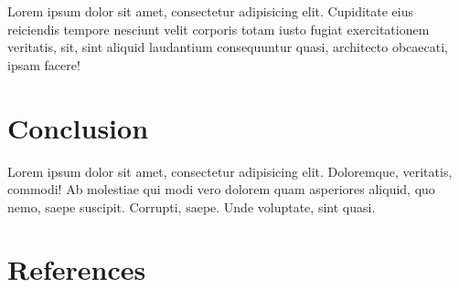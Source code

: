 \documentclass[]{article}
\begin{document}
Lorem ipsum dolor sit amet, consectetur adipisicing elit. Cupiditate
eius reiciendis tempore nesciunt velit corporis totam iusto fugiat
exercitationem veritatis, sit, sint aliquid laudantium consequuntur
quasi, architecto obcaecati, ipsam facere!

\section{Conclusion}\label{conclusion}

Lorem ipsum dolor sit amet, consectetur adipisicing elit. Doloremque,
veritatis, commodi! Ab molestiae qui modi vero dolorem quam asperiores
aliquid, quo nemo, saepe suscipit. Corrupti, saepe. Unde voluptate, sint
quasi.

\section{References}\label{references}
\end{document}
